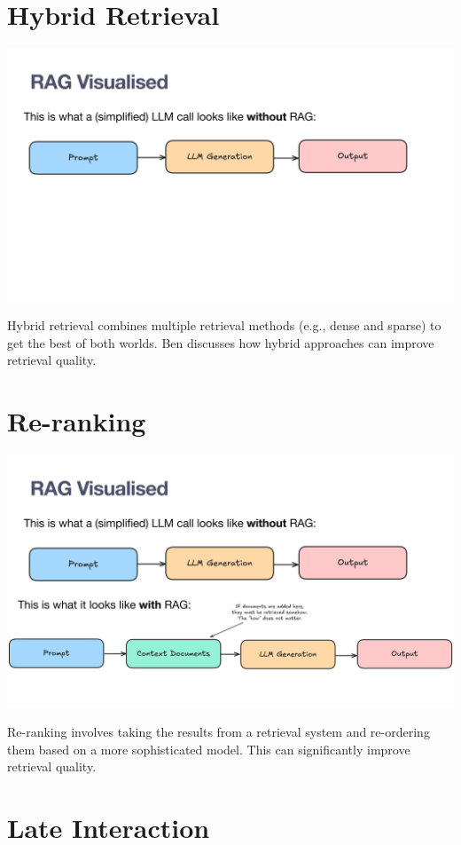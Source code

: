 \documentclass[
  letterpaper,
  oneside]{scrbook}
\begin{document}
\section{Hybrid Retrieval}\label{hybrid-retrieval}

\includegraphics{chapters/../p1-images/slide_6.png}

Hybrid retrieval combines multiple retrieval methods (e.g., dense and
sparse) to get the best of both worlds. Ben discusses how hybrid
approaches can improve retrieval quality.

\section{Re-ranking}\label{re-ranking}

\includegraphics{chapters/../p1-images/slide_7.png}

Re-ranking involves taking the results from a retrieval system and
re-ordering them based on a more sophisticated model. This can
significantly improve retrieval quality.

\section{Late Interaction}\label{late-interaction}
\end{document}

